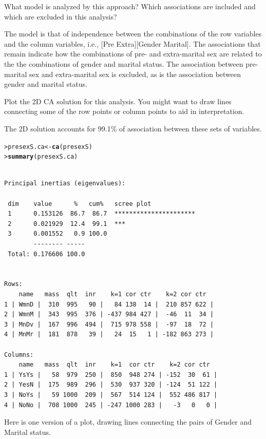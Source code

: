 \documentclass[10pt]{report}\usepackage[]{graphicx}\usepackage[]{color}
\makeatletter
\newcommand{\hlstd}[1]{\textcolor[rgb]{0.345,0.345,0.345}{#1}}%
\newcommand{\hlkwb}[1]{\textcolor[rgb]{0.69,0.353,0.396}{#1}}%
\newcommand{\hlkwd}[1]{\textcolor[rgb]{0.737,0.353,0.396}{\textbf{#1}}}%
\newenvironment{kframe}{%
 \def\at@end@of@kframe{}%
 \ifinner\ifhmode%
  \def\at@end@of@kframe{\end{minipage}}%
  \begin{minipage}{\columnwidth}%
 \fi\fi%
 \def\FrameCommand##1{\hskip\@totalleftmargin \hskip-\fboxsep
 \colorbox{shadecolor}{##1}\hskip-\fboxsep
     \hskip-\linewidth \hskip-\@totalleftmargin \hskip\columnwidth}%
 \MakeFramed {\advance\hsize-\width
   \@totalleftmargin\z@ \linewidth\hsize
   \@setminipage}}%
 {\par\unskip\endMakeFramed%
 \at@end@of@kframe}
\newenvironment{knitrout}{}{} %
\renewenvironment{knitrout}{\small\renewcommand{\baselinestretch}{.85}}{} %
\makeatother
\begin{document}
\begin{Exercises}
  \begin{enumerate*}
  	  \item What \loglin model is analyzed by this approach? Which associations are included and
  	  which are excluded in this analysis?
  	  \begin{ans}
  	  The model is that of independence between the combinations of the row variables and the
  	  column variables, i.e., [Pre Extra][Gender Marital].
  	  The associations that remain indicate how the combinations of pre- and extra-marital sex
  	  are related to the the combinations of gender and marital status.  
  	  The association between pre-marital sex and extra-marital sex is excluded, as is the
  	  association between gender and marital status.
  	  \end{ans}
  	  
  	  \item Plot the 2D CA solution for this analysis.  You might want to draw lines connecting
  	  some of the row points or column points to aid in interpretation.
  	  \begin{ans}
  	  The 2D solution accounts for 99.1\% of association between these sets of variables.
\begin{knitrout}\footnotesize
{}\color{fgcolor}\begin{kframe}
\begin{alltt}
\hlstd{> }\hlstd{presexS.ca} \hlkwb{<-} \hlkwd{ca}\hlstd{(presexS)}
\hlstd{> }\hlkwd{summary}\hlstd{(presexS.ca)}
\end{alltt}
\begin{verbatim}

Principal inertias (eigenvalues):

 dim    value      %   cum%   scree plot               
 1      0.153126  86.7  86.7  **********************   
 2      0.021929  12.4  99.1  ***                      
 3      0.001552   0.9 100.0                           
        -------- -----                                 
 Total: 0.176606 100.0                                 


Rows:
    name   mass  qlt  inr    k=1 cor ctr    k=2 cor ctr  
1 | WmnD |  310  995   90 |   84 138  14 |  210 857 622 |
2 | WmnM |  343  995  376 | -437 984 427 |  -46  11  34 |
3 | MnDv |  167  996  494 |  715 978 558 |  -97  18  72 |
4 | MnMr |  181  878   39 |   24  15   1 | -182 863 273 |

Columns:
    name   mass  qlt  inr    k=1  cor ctr    k=2 cor ctr  
1 | YsYs |   58  979  250 |  850  948 274 | -152  30  61 |
2 | YesN |  175  989  296 |  530  937 320 | -124  51 122 |
3 | NoYs |   59 1000  209 |  567  514 124 |  552 486 817 |
4 | NoNo |  708 1000  245 | -247 1000 283 |   -3   0   0 |
\end{verbatim}
\end{kframe}
\end{knitrout}
      Here is one version of a plot, drawing lines connecting the pairs of Gender and Marital
      status.
      

\end{ans}
\end{enumerate*}
\end{Exercises}
\end{document}
